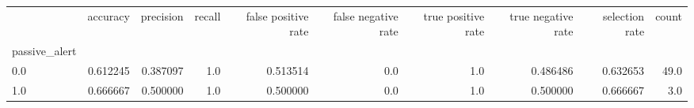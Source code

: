 \begin{tabular}{lrrrrrrrrr}
\toprule
{} &  accuracy &  precision &  recall &  false positive rate &  false negative rate &  true positive rate &  true negative rate &  selection rate &  count \\
passive\_alert &           &            &         &                      &                      &                     &                     &                 &        \\
\midrule
0.0           &  0.612245 &   0.387097 &     1.0 &             0.513514 &                  0.0 &                 1.0 &            0.486486 &        0.632653 &   49.0 \\
1.0           &  0.666667 &   0.500000 &     1.0 &             0.500000 &                  0.0 &                 1.0 &            0.500000 &        0.666667 &    3.0 \\
\bottomrule
\end{tabular}
